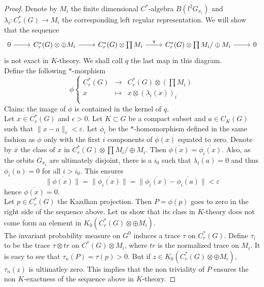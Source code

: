 \begin{proof}
Denote by $M_i$ the finite dimensional $C^*$-algebra $B(l^2G_{x_i})$ and $\lambda_i : C^*_r(G) \rightarrow M_i $ the corresponding left regular representation. We will show that the sequence 
\[ \begin{tikzcd} 0 \arrow{r} & 
C^*_r(G)\otimes \oplus M_i \arrow{r} & C^*_r(G)\otimes \prod M_i  \arrow{r}{q} & C^*_r(G)\otimes \prod M_i / \oplus M_i  \arrow{r} & 
0 \end{tikzcd}\]
is not exact in $K$-theory. We shall call $q$ the last map in this diagram.\\

Define the following $*$-morphism 
\[\phi \left\{ \begin{array}{rcl}
C^*_r(G) & \rightarrow  & C^*_r(G) \otimes \left(\prod M_i\right) \\
x        & \mapsto& x\otimes (\lambda_i(x))_i \\
\end{array} \right.\]
Claim: the image of $\phi$ is contained in the kernel of $q$.\\

Let $x\in C_r^*(G)$ and $\epsilon>0$. Let $K\subset G$ be a compact subset and $a\in C_K(G)$ such that $\| x - a \|_r <\varepsilon$. Let $\phi_i$ be the $*$-homomorphism defined in the same fashion as $\phi$ only with the first $i$ components of $\phi(x)$ equated to zero. Denote by $\overline x$ the class of $x$ in $C^*_r(G)\otimes \prod M_i / \oplus M_i $. Then $\overline {\phi(x)} = \overline{\phi_i (x)}$. Also, as the orbits $G_{x_i}$ are ultimately disjoint, there is a $i_0$ such that $\lambda_i(a)=0$ and thus $\phi_i(a)= 0$ for all $i>i_0$. This ensures
\[ \|\overline{\phi(x)} \|  = \|\overline{\phi_{i}(x)}\| = \|\overline{\phi_{i}(x)}-\overline{\phi_{i}(a)}\| < \varepsilon \]
hence $\overline{\phi(x)}=0$.\\

Let $p\in C^*_r(G)$ the Kazdhan projection. Then $P=\phi(p)$ goes to zero in the right side of the sequence above. Let us show that its class in $K$-theory does not come form an element in $K_0(C^*_r(G)\otimes \oplus M_i )$.\\

The invariant probability measure on $G^0$ induces a trace $\tau$ on $C^*_r(G)$. Define $\tau_i$ to be the trace $\tau \otimes tr$ on $C^*(G)\otimes M_i$, where $tr$ is the normalized trace on $M_i$. It is easy to see that $\tau_n(P) = \tau(p)>0$. But if $z\in K_0(C^*_r(G)\otimes \oplus M_i)$, $\tau_n(z)$ is ultimatley zero. This implies that the non triviality of $P$ ensures the non $K$-exactness of the sequence above in $K$-theory.  

\end{proof}

